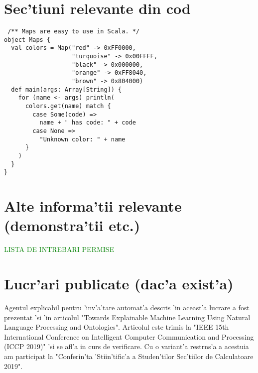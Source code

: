 \appendix
\chapter{Sec'tiuni relevante din cod}

\begin{verbatim}
 /** Maps are easy to use in Scala. */
object Maps {
  val colors = Map("red" -> 0xFF0000,
                   "turquoise" -> 0x00FFFF,
                   "black" -> 0x000000,
                   "orange" -> 0xFF8040,
                   "brown" -> 0x804000)
  def main(args: Array[String]) {
    for (name <- args) println(
      colors.get(name) match {
        case Some(code) =>
          name + " has code: " + code
        case None =>
          "Unknown color: " + name
      }
    )
  }
}
\end{verbatim}

\chapter{Alte informa'tii relevante (demonstra'tii etc.)}

\textcolor{green}{LISTA DE INTREBARI PERMISE}

\chapter{Lucr'ari publicate (dac'a exist'a)}

Agentul explicabil pentru 'inv'a'tare automat'a descris 'in aceast'a lucrare a fost prezentat 'si 'in articolul "Towards Explainable Machine Learning Using  Natural Language Processing and Ontologies". Articolul este trimis la "IEEE 15th International Conference on
Intelligent Computer Communication and Processing (ICCP 2019)" 'si se afl'a in curs de verificare. Cu o variant'a restr\ia ns'a a acestuia am participat la "Conferin'ta 'Stiin'tific'a a Studen'tilor Sec'tiilor de Calculatoare 2019".

